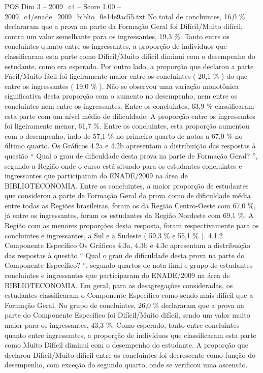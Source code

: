 \begin{textsample}{POS Dim 3 – 2009\_c4 – Score 1.00 – 2009\_c4/enade\_2009\_biblio\_0e14e9ac55.txt}
No total de concluintes, 16,0 \% declararam que a prova na parte da Formação Geral foi Difícil/Muito difícil, contra um valor semelhante para os ingressantes, 19,3 \%.
Tanto entre os concluintes quanto entre os ingressantes, a proporção de indivíduos que classificaram esta parte como Difícil/Muito difícil diminui com o desempenho do estudante, como era esperado.
Por outro lado, a proporção que declarou a parte Fácil/Muito fácil foi ligeiramente maior entre os concluintes ( 20,1 \% ) do que entre os ingressantes ( 19,0 \% ).
Não se observou uma variação monotônica significativa desta proporção com o aumento no desempenho, nem entre os concluintes nem entre os ingressantes.
Entre os concluintes, 63,9 \% classificaram esta parte com um nível médio de dificuldade.
A proporção entre os ingressantes foi ligeiramente menor, 61,7 \%.
Entre os concluintes, esta proporção aumentou com o desempenho, indo de 57,1 \% no primeiro quarto de notas a 67,0 \% no último quarto.
Os Gráficos 4.2a e 4.2b apresentam a distribuição das respostas à questão “ Qual o grau de dificuldade desta prova na parte de Formação Geral? ”, segundo a Região onde o curso está situado para os estudantes concluintes e ingressantes que participaram do ENADE/2009 na área de BIBLIOTECONOMIA.
Entre os concluintes, a maior proporção de estudantes que considerou a parte de Formação Geral da prova como de dificuldade média entre todas as Regiões brasileiras, foram os da Região Centro-Oeste com 67,0 \%, já entre os ingressantes, foram os estudantes da Região Nordeste com 69,1 \%.
A Região com as menores proporções desta resposta, foram respectivamente para os concluintes e ingressantes, a Sul e a Sudeste ( 59,3 \% e 55,1 \% ). 4.1.2 Componente Específico Os Gráficos 4.3a, 4.3b e 4.3c apresentam a distribuição das respostas à questão “ Qual o grau de dificuldade desta prova na parte do Componente Específico? ”, segundo quartos de nota final e grupo de estudantes concluintes e ingressantes que participaram do ENADE/2009 na área de BIBLIOTECONOMIA.
Em geral, para as desagregações consideradas, os estudantes classificaram o Componente Específico como sendo mais difícil que a Formação Geral.
No grupo de concluintes, 26,0 \% declararam que a prova na parte do Componente Específico foi Difícil/Muito difícil, sendo um valor muito maior para os ingressantes, 43,3 \%.
Como esperado, tanto entre concluintes quanto entre ingressantes, a proporção de indivíduos que classificaram esta parte como Muito Difícil diminui com o desempenho do estudante.
A proporção que declarou Difícil/Muito difícil entre os concluintes foi decrescente como função do desempenho, com exceção do segundo quarto, onde se verificou uma ascensão.

\end{textsample}
